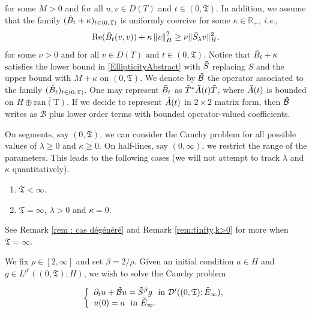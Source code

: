 \documentclass[11pt, letterpaper]{amsart}
\theoremstyle{definition}
\theoremstyle{remark}
\numberwithin{equation}{section}
\begin{document}
for some $M>0$ and for all $u,v \in D({T})$ and $t \in (0,\mathfrak{T})$.
In addition, we assume that the family $(\Tilde{B}_t+\kappa)_{t \in (0,\mathfrak{T})}$ is uniformly coercive for some $\kappa \in \mathbb{R}_+$, \textit{i.e.}, 
\begin{equation}\label{eq:unifcoercive}
     \mathrm{Re}(\Tilde{B}_t(v,v))+\kappa \left\|v \right\|_H^2 \geq \nu  \|\Tilde{S}_\lambda v \|_H^2,
\end{equation}
for some $\nu>0$ and for all $v \in D(T)$ and $t \in (0,\mathfrak{T})$. Notice that $\Tilde{B}_t+\kappa$ satisfies the lower bound in \eqref{EllipticityAbstract} with  $\Tilde{S}$ replacing $S$ and the upper bound with $M+\kappa$ on $(0,\mathfrak{T})$. We denote by $\Tilde{\mathcal{B}}$ the  operator associated to the family $(\Tilde{B}_t)_{t \in (0,\mathfrak{T})}$.
One may represent  $\Tilde{B}_t$ as $ \Tilde{T}^*\Tilde{A}(t)\Tilde{T}$, where $\Tilde{A}(t)$ is bounded on $H\oplus \overline{\mathrm{ran(T)}}$.
If we decide to represent $\Tilde{A}(t)$ in $2\times 2$ matrix form, then $\Tilde{\mathcal{B}}$ writes as ${\mathcal{B}}$ plus lower order terms with bounded operator-valued coefficients.

{On segments, say $(0, \mathfrak{T})$, we can consider the Cauchy problem for all possible values of $\lambda \geq 0$ and $\kappa \geq 0$. On half-lines, say $(0, \infty)$, we restrict the range of the parameters. This leads to the following cases (we will not attempt to track $\lambda$ and $\kappa$ quantitatively).}
\begin{enumerate}
    \item [(a)]  $\mathfrak{T}<\infty$. 
    \item[(b)] $\mathfrak{T}=\infty$, $\lambda>0$ and $\kappa=0$. 
\end{enumerate}
See Remark \ref{rem : cas dégénéré} and  Remark \ref{rem:tinfty,k>0}  for more when  $\mathfrak{T}=\infty$.

We fix $\rho \in [2,\infty]$ and set $\beta={2}/{\rho}$. Given an initial condition $a\in H$ and 
$g\in L^{\rho'}((0,\mathfrak{T});H)$, we wish to solve  the Cauchy problem



\begin{align}\label{Pb Cauchy inhomogène}
\left\{
    \begin{array}{ll}
         \partial_t u +\Tilde{\mathcal{B}}u = 
        \Tilde{S}^\beta {g}    \ \ \mathrm{in} \ \mathcal{D}'((0,\mathfrak{T});\Tilde{E}_{\infty}), \\
         u(0)=a \ \ \mathrm{in} \ \Tilde{E}_{\infty}.
    \end{array}
\right.
\end{align}
\end{document}
